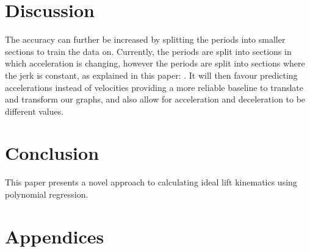 \documentclass[12pt,a4paper]{article}
\begin{document}
\section{Discussion}
The accuracy can further be increased by splitting the periods into smaller sections to train the data on. Currently, the periods are split into sections in which acceleration is changing, however the periods are split into sections where the jerk is constant, as explained in this paper: \cite{GenerationApplicationDynamicLiftKinematics}. It will then favour predicting accelerations instead of velocities providing a more reliable baseline to translate and transform our graphs, and also allow for acceleration and deceleration to be different values.


\section{Conclusion}
This paper presents a novel approach to calculating ideal lift kinematics using polynomial regression.

\appendix
\section*{Appendices}



\end{document}
